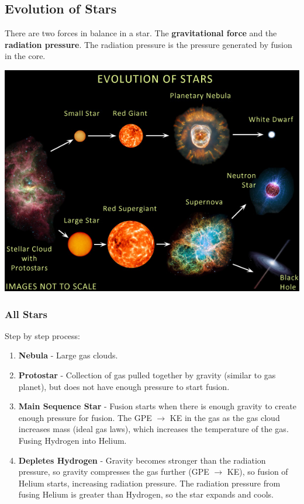 \documentclass[a4paper, 12pt]{article}
\begin{document}
\subsection{Evolution of Stars}

There are two forces in balance in a star. The \textbf{gravitational force} and the \textbf{radiation pressure}. The radiation pressure is the pressure generated by fusion in the core.

\includegraphics[width=\textwidth]{images/starLifeCycle.jpg}

\subsubsection{All Stars}

Step by step process:

\begin{enumerate}
	\item \textbf{Nebula} - Large gas clouds.

	\item \textbf{Protostar} - Collection of gas pulled together by gravity (similar to gas planet), but does not have enough pressure to start fusion.

	\item \textbf{Main Sequence Star} - Fusion starts when there is enough gravity to create enough pressure for fusion. The GPE $\rightarrow$ KE in the gas as the gas cloud increases mass (ideal gas laws), which increases the temperature of the gas. Fusing Hydrogen into Helium.

	\item \textbf{Depletes Hydrogen} - Gravity becomes stronger than the radiation pressure, so gravity compresses the gas further (GPE $\rightarrow$ KE), so fusion of Helium starts, increasing radiation pressure. The radiation pressure from fusing Helium is greater than Hydrogen, so the star expands and cools.
\end{enumerate}
\end{document}
